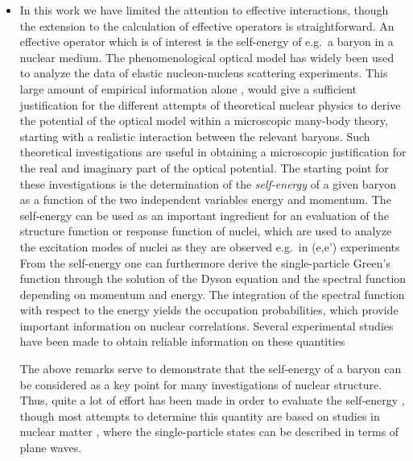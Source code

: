 \begin{itemize}
\item
In this work we have limited the attention to effective
interactions,  though the extension to the calculation of effective
operators is straightforward.
An effective operator which is of interest is the self-energy
of e.g.\ a baryon in a nuclear medium.
The phenomenological
optical model has widely been used to analyze the data
of elastic  nucleon-nucleus scattering experiments. This large
amount of empirical information alone \cite{ms91}, would give
a sufficient justification for the different attempts of theoretical
nuclear physics to derive the potential of the optical model
within a microscopic many-body theory, starting with a realistic
interaction between the relevant baryons.
Such theoretical investigations are useful in
obtaining  a microscopic justification  for the real and imaginary
part of the optical potential. 
The starting point for these investigations is the 
determination of the {\em self-energy} 
of a given baryon
as a function of the two independent variables energy and 
momentum.
The self-energy can be
used as an important ingredient for an evaluation of the structure
function or response function of nuclei, which are used to
analyze the excitation modes of nuclei as they are observed
e.g.\ in (e,e') experiments \cite{frois}
From the self-energy one can furthermore derive the single-particle
Green's function through the solution of the Dyson equation and
the spectral function depending on momentum
and energy. The integration of the spectral function with respect
to the energy yields the occupation
probabilities, which provide important information on nuclear
correlations. Several experimental studies have been made
to obtain reliable information on these quantities \cite{exp}

The above remarks serve to demonstrate that the self-energy of
a baryon can be considered as a key point for many
investigations of nuclear structure. Thus, quite a lot of effort
has been made in order to evaluate the self-energy \cite{ms91},
though most attempts to determine this quantity are based on studies
in nuclear matter \cite{rpd89}, where the single-particle
states can be described in terms of plane waves. 


\end{itemize}
